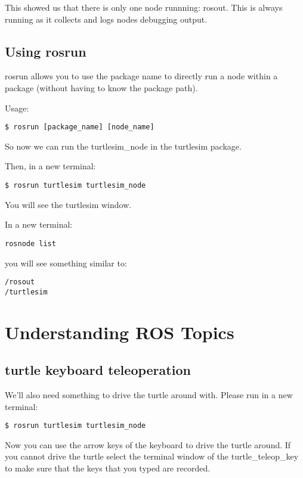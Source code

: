 This showed us that there is only one node runnning: rosout. This is always running as it collects and logs nodes debugging output.

\subsection{Using rosrun}
rosrun allows you to use the package name to directly run a node within a package (without having to know the package path).

Usage:
\begin{lstlisting}[breaklines=true languages=bash]
$ rosrun [package_name] [node_name]
\end{lstlisting}

So now we can run the turtlesim\_node in the turtlesim package.

Then, in a new terminal:

\begin{lstlisting}[breaklines=true languages=bash]
$ rosrun turtlesim turtlesim_node
\end{lstlisting}

You will see the turtlesim window.

In a new terminal:

\begin{lstlisting}[breaklines=true languages=bash]
rosnode list
\end{lstlisting}

you will see something similar to:
\begin{lstlisting}[breaklines=true languages=bash]
/rosout
/turtlesim
\end{lstlisting}

\section{Understanding ROS Topics}
\subsection{turtle keyboard teleoperation}
We'll also need something to drive the turtle around with. Please run in a new terminal:

\begin{lstlisting}[breaklines=true languages=bash]
$ rosrun turtlesim turtlesim_node
\end{lstlisting}

Now you can use the arrow keys of the keyboard to drive the turtle around. If you cannot drive the turtle select the terminal window of the turtle\_teleop\_key to make sure that the keys that you typed are recorded.

